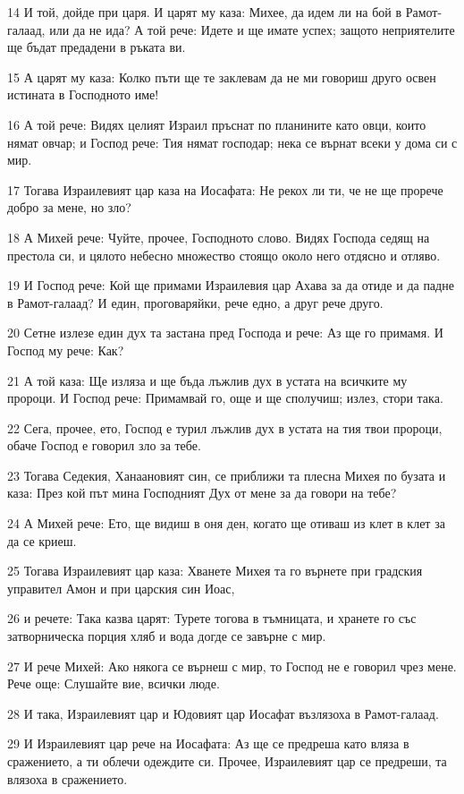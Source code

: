 \par 14 И той, дойде при царя. И царят му каза: Михее, да идем ли на бой в Рамот-галаад, или да не ида? А той рече: Идете и ще имате успех; защото неприятелите ще бъдат предадени в ръката ви.
\par 15 А царят му каза: Колко пъти ще те заклевам да не ми говориш друго освен истината в Господното име!
\par 16 А той рече: Видях целият Израил пръснат по планините като овци, които нямат овчар; и Господ рече: Тия нямат господар; нека се върнат всеки у дома си с мир.
\par 17 Тогава Израилевият цар каза на Иосафата: Не рекох ли ти, че не ще прорече добро за мене, но зло?
\par 18 А Михей рече: Чуйте, прочее, Господното слово. Видях Господа седящ на престола си, и цялото небесно множество стоящо около него отдясно и отляво.
\par 19 И Господ рече: Кой ще примами Израилевия цар Ахава за да отиде и да падне в Рамот-галаад? И един, проговаряйки, рече едно, а друг рече друго.
\par 20 Сетне излезе един дух та застана пред Господа и рече: Аз ще го примамя. И Господ му рече: Как?
\par 21 А той каза: Ще изляза и ще бъда лъжлив дух в устата на всичките му пророци. И Господ рече: Примамвай го, още и ще сполучиш; излез, стори така.
\par 22 Сега, прочее, ето, Господ е турил лъжлив дух в устата на тия твои пророци, обаче Господ е говорил зло за тебе.
\par 23 Тогава Седекия, Ханаановият син, се приближи та плесна Михея по бузата и каза: През кой път мина Господният Дух от мене за да говори на тебе?
\par 24 А Михей рече: Ето, ще видиш в оня ден, когато ще отиваш из клет в клет за да се криеш.
\par 25 Тогава Израилевият цар каза: Хванете Михея та го върнете при градския управител Амон и при царския син Иоас,
\par 26 и речете: Така казва царят: Турете тогова в тъмницата, и хранете го със затворническа порция хляб и вода догде се завърне с мир.
\par 27 И рече Михей: Ако някога се върнеш с мир, то Господ не е говорил чрез мене. Рече още: Слушайте вие, всички люде.
\par 28 И така, Израилевият цар и Юдовият цар Иосафат възлязоха в Рамот-галаад.
\par 29 И Израилевият цар рече на Иосафата: Аз ще се предреша като вляза в сражението, а ти облечи одеждите си. Прочее, Израилевият цар се предреши, та влязоха в сражението.
